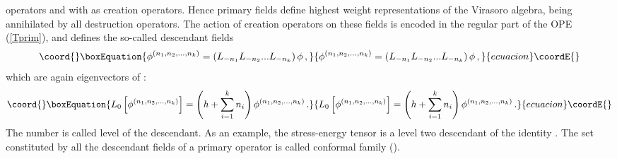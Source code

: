 \documentclass[a4paper,12pt]{report}
\begin{document}
operators and with \coordHE{} as creation operators. Hence primary fields define highest weight representations of the
Virasoro algebra, being annihilated by all destruction operators. The action of creation operators on these
fields is encoded in the regular part of the OPE (\ref{Tprim}), and defines the so-called descendant fields
\begin{equation}\coord{}\boxEquation{\label{desc}
\phi^{(n_{1},n_{2},...,n_{k})}=\left(L_{-n_{1}}L_{-n_{2}}...L_{-n_{k}}\right)\phi \,,
}{\phi^{(n_{1},n_{2},...,n_{k})}=\left(L_{-n_{1}}L_{-n_{2}}...L_{-n_{k}}\right)\phi \,,
}{ecuacion}\coordE{}\end{equation}
which are again eigenvectors of \coordHE{}:
\begin{equation}\coord{}\boxEquation{\label{hdesc}
L_{0}\left[\phi^{(n_{1},n_{2},...,n_{k})}\right]=\left(h+\sum_{i=1}^{k}n_{i}\right)\phi^{(n_{1},n_{2},...,n_{k})}\,.
}{L_{0}\left[\phi^{(n_{1},n_{2},...,n_{k})}\right]=\left(h+\sum_{i=1}^{k}n_{i}\right)\phi^{(n_{1},n_{2},...,n_{k})}\,.
}{ecuacion}\coordE{}\end{equation}
The number \coordHE{} is called level of the descendant. As an example, the stress-energy tensor is
a level two descendant of the identity \coordHE{}. The set \myHighlight{$[\phi]$}\coordHE{} constituted by all the descendant fields
of a primary operator \myHighlight{$\phi$}\coordHE{} is called conformal family (\cite{bpz}).
\end{document}
